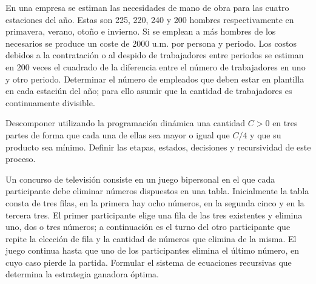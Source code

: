 \documentclass[twoside]{article}
\begin{document}
\newpage 
\begin{ejercicio}{5}
En una empresa se estiman las necesidades de mano de obra para las cuatro estaciones del año.
Estas son 225, 220, 240 y 200 hombres respectivamente en primavera, verano, otoño e invierno.
Si se emplean a más hombres de los necesarios se produce un coste de 2000 u.m. por persona
y periodo. Los costos debidos a la contratación o al despido de trabajadores entre periodos se
estiman en 200 veces el cuadrado de la diferencia entre el número de trabajadores en uno y otro
periodo.
Determinar el número de empleados que deben estar en plantilla en cada estaciún del año; para
ello asumir que la cantidad de trabajadores es continuamente divisible.
\begin{solucion}
\end{solucion}
\end{ejercicio}

\newpage 
\begin{ejercicio}{6}
Descomponer utilizando la programación dinámica una cantidad $C > 0$ en tres partes de forma
que cada una de ellas sea mayor o igual que $C/4$ y que su producto sea mínimo. Definir las etapas,
estados, decisiones y recursividad de este proceso.
\end{ejercicio}
\begin{solucion}

\end{solucion}

\newpage 
\begin{ejercicio}{7}
Un concurso de televisión consiste en un juego bipersonal en el que cada participante debe
eliminar números dispuestos en una tabla. Inicialmente la tabla consta de tres filas, en la primera
hay ocho números, en la segunda cinco y en la tercera tres. El primer participante elige una fila de
las tres existentes y elimina uno, dos o tres números; a continuación es el turno del otro participante
que repite la elección de fila y la cantidad de números que elimina de la misma. El juego continua
hasta que uno de los participantes elimina el último número, en cuyo caso pierde la partida.
Formular el sistema de ecuaciones recursivas que determina la estrategia ganadora óptima.
\end{ejercicio}
\begin{solucion}

\end{solucion}
\end{document}
